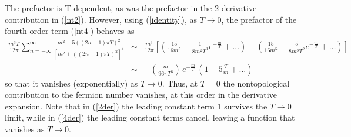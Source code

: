 \documentclass[a4paper,prd]{revtex4}
\begin{document}
The prefactor is T dependent, as was the prefactor in the 2-derivative
contribution in (\ref{nt2}).  However, using (\ref{identity}),  as
$T\to 0$, the prefactor of the fourth order term (\ref{nt4}) behaves as
\begin{eqnarray}
 \frac{m^3 T}{12\pi} \sum_{n=-\infty}^\infty \frac{m^2-5((2n+1)\pi
T)^2}{[m^2+((2n+1)\pi T)^2]^4} & \sim &  \frac{m^3}{12
\pi}\left[\left(\frac{15}{16 m^5}-\frac{1}{8 m^2
T^3}e^{-\frac{m}{T}}+\dots\right)-\left(\frac{15}{16 m^5}-\frac{5}{8
m^3 T^2}e^{-\frac{m}{T}}+\dots\right) \right] \nonumber \\ & \sim  &
-\left(\frac{m}{96\pi
T^3}\right)\,e^{-\frac{m}{T}}\,\left(1-5\frac{T}{m}+\dots\right)
\label{4der}
\end{eqnarray}
so that it vanishes (exponentially) as $T\to 0$.  Thus, at $T=0$ the 
nontopological contribution to the  fermion number vanishes, at this
order in the derivative expansion.  Note that in (\ref{2der})
the leading constant term 1 survives the $T\to 0$ limit, while  in
(\ref{4der}) the leading constant terms cancel, leaving a
function that vanishes as $T\to 0$. 
\end{document}
